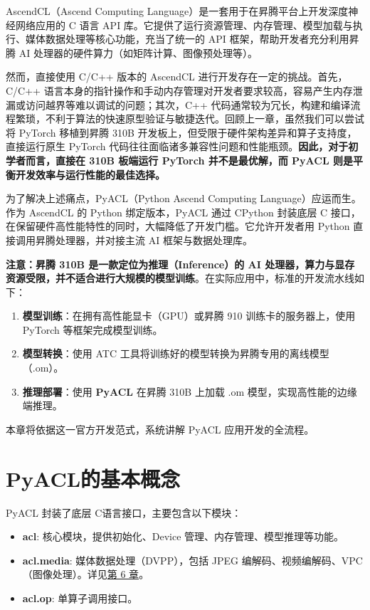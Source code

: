 AscendCL（Ascend Computing
Language）是一套用于在昇腾平台上开发深度神经网络应用的 C 语言 API
库。它提供了运行资源管理、内存管理、模型加载与执行、媒体数据处理等核心功能，充当了统一的
API 框架，帮助开发者充分利用昇腾 AI
处理器的硬件算力（如矩阵计算、图像预处理等）。

然而，直接使用 C/C++ 版本的 AscendCL 进行开发存在一定的挑战。首先，C/C++
语言本身的指针操作和手动内存管理对开发者要求较高，容易产生内存泄漏或访问越界等难以调试的问题；其次，C++
代码通常较为冗长，构建和编译流程繁琐，不利于算法的快速原型验证与敏捷迭代。回顾上一章，虽然我们可以尝试将
PyTorch 移植到昇腾 310B
开发板上，但受限于硬件架构差异和算子支持度，直接运行原生 PyTorch
代码往往面临诸多兼容性问题和性能瓶颈。\textbf{因此，对于初学者而言，直接在
310B 板端运行 PyTorch 并不是最优解，而 PyACL
则是平衡开发效率与运行性能的最佳选择。}

为了解决上述痛点，PyACL（Python Ascend Computing
Language）应运而生。作为 AscendCL 的 Python 绑定版本，PyACL 通过 CPython
封装底层 C
接口，在保留硬件高性能特性的同时，大幅降低了开发门槛。它允许开发者用
Python 直接调用昇腾处理器，并对接主流 AI 框架与数据处理库。

\textbf{注意：昇腾 310B 是一款定位为推理（Inference）的 AI
处理器，算力与显存资源受限，并不适合进行大规模的模型训练}。在实际应用中，标准的开发流水线如下：

\begin{enumerate}
\def\labelenumi{\arabic{enumi}.}
\tightlist
\item
  \textbf{模型训练}：在拥有高性能显卡（GPU）或昇腾 910
  训练卡的服务器上，使用 PyTorch 等框架完成模型训练。
\item
  \textbf{模型转换}：使用 ATC
  工具将训练好的模型转换为昇腾专用的离线模型（.om）。
\item
  \textbf{推理部署}：使用 \textbf{PyACL} 在昇腾 310B 上加载 .om
  模型，实现高性能的边缘端推理。
\end{enumerate}

本章将依据这一官方开发范式，系统讲解 PyACL 应用开发的全流程。

\section{PyACL的基本概念}\label{src-book-chapter4-h1}

PyACL 封装了底层 C语言接口，主要包含以下模块：

\begin{itemize}
\tightlist
\item
  \textbf{acl}: 核心模块，提供初始化、Device
  管理、内存管理、模型推理等功能。
\item
  \textbf{acl.media}: 媒体数据处理（DVPP），包括 JPEG
  编解码、视频编解码、VPC（图像处理）。详见\hyperref[dvpp-basics]{第 6
  章}。
\item
  \textbf{acl.op}: 单算子调用接口。
\end{itemize}

